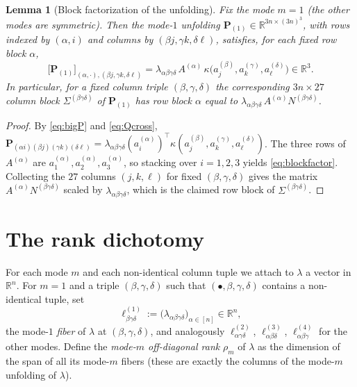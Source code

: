 \documentclass[12pt]{article}
\newcommand{\bR}{\mathbb{R}}
\newtheorem{lemma}{Lemma}
\theoremstyle{definition}
\begin{document}
\begin{lemma}[Block factorization of the unfolding]\label{lem:factor}
Fix the mode $m=1$ (the other modes are symmetric).  Then the mode-$1$ unfolding
$\mathbf P_{(1)}\in\bR^{3n\times(3n)^3}$, with rows indexed by $(\alpha,i)$ and
columns by $(\beta j,\gamma k,\delta\ell)$, satisfies, for each fixed row block
$\alpha$,
\begin{equation}\label{eq:blockfactor}
\bigl[\mathbf P_{(1)}\bigr]_{(\alpha,\cdot),(\beta j,\gamma k,\delta\ell)}
=\lambda_{\alpha\beta\gamma\delta}\,
A^{(\alpha)}\,\kappa\bigl(a^{(\beta)}_j,a^{(\gamma)}_k,a^{(\delta)}_\ell\bigr)
\in\bR^3 .
\end{equation}
In particular, for a fixed column triple $(\beta,\gamma,\delta)$ the corresponding
$3n\times27$ column block $\Sigma^{(\beta\gamma\delta)}$ of $\mathbf P_{(1)}$ has
row block $\alpha$ equal to
$\lambda_{\alpha\beta\gamma\delta}\,A^{(\alpha)}N^{(\beta\gamma\delta)}$.
\end{lemma}

\begin{proof}
By \eqref{eq:bigP} and \eqref{eq:Qcross},
$\mathbf P_{(\alpha i)(\beta j)(\gamma k)(\delta\ell)}
=\lambda_{\alpha\beta\gamma\delta}(a^{(\alpha)}_i)^\top
\kappa(a^{(\beta)}_j,a^{(\gamma)}_k,a^{(\delta)}_\ell)$.
The three rows of $A^{(\alpha)}$ are $a^{(\alpha)}_1,a^{(\alpha)}_2,a^{(\alpha)}_3$,
so stacking over $i=1,2,3$ yields \eqref{eq:blockfactor}.  Collecting the $27$
columns $(j,k,\ell)$ for fixed $(\beta,\gamma,\delta)$ gives the matrix
$A^{(\alpha)}N^{(\beta\gamma\delta)}$ scaled by $\lambda_{\alpha\beta\gamma\delta}$,
which is the claimed row block of $\Sigma^{(\beta\gamma\delta)}$.
\end{proof}

\section{The rank dichotomy}

For each mode $m$ and each non-identical column tuple we attach to $\lambda$ a
vector in $\bR^n$.  For $m=1$ and a triple $(\beta,\gamma,\delta)$ such that
$(\bullet,\beta,\gamma,\delta)$ contains a non-identical tuple, set
\begin{equation}\label{eq:fiber}
\ell^{(1)}_{\beta\gamma\delta}:=\bigl(\lambda_{\alpha\beta\gamma\delta}\bigr)_{\alpha\in[n]}\in\bR^n,
\end{equation}
the mode-$1$ \emph{fiber} of $\lambda$ at $(\beta,\gamma,\delta)$, and analogously
$\ell^{(2)}_{\alpha\gamma\delta}$, $\ell^{(3)}_{\alpha\beta\delta}$,
$\ell^{(4)}_{\alpha\beta\gamma}$ for the other modes.  Define the \emph{mode-$m$
off-diagonal rank} $\rho_m$ of $\lambda$ as the dimension of the span of all its
mode-$m$ fibers (these are exactly the columns of the mode-$m$ unfolding of
$\lambda$).
\end{document}
